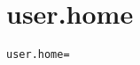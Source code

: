 \section{user.home}
\label{configuration:UserHome}
\AvailableInJavaOnly{\TODO}
\begin{lstlisting}[style=Props,caption={Usage example for \textit{user.home}}]
user.home=
\end{lstlisting}
